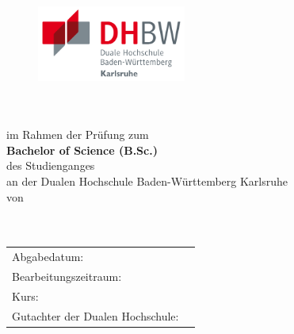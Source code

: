\thispagestyle{empty}
\begin{titlepage}
\enlargethispage{4cm}


\begin{figure}
	\hfill\begin{minipage}{.5\textwidth}\centering
		\includegraphics[height=2.5cm]{Bilder/Logos/Logo_DHBW.pdf} 
	\end{minipage}
\end{figure}
\vspace*{0.1cm}

\begin{center}
	\huge{\textbf{\titel}}\\[1.5cm]
	\Large{\textbf{\arbeit}}\\[0.5cm]
	\normalsize{im Rahmen der Prüfung zum\\[1ex] \textbf{Bachelor of Science (B.Sc.)}}\\[0.5cm]
	\Large{des Studienganges \studiengang}\\[1ex]
	\normalsize{an der Dualen Hochschule Baden-Württemberg Karlsruhe}\\[1cm]
	\normalsize{von}\\[1ex] \Large{\textbf{\autor}} \\[1ex] \Large{\textbf{\autorzwei}} \\[1cm]
\end{center}

\begin{center}
	\vfill
	\begin{tabular}{ll}
		Abgabedatum:                     & \abgabe \\[0.2cm]
		Bearbeitungszeitraum:            & \bearbeitungszeitraum \\[0.2cm]
		Kurs:            				 & \kurs \\[0.2cm]
		Gutachter der Dualen Hochschule: & \betreuerDhbw \\[2cm]
	\end{tabular} 
\end{center}
\end{titlepage}

